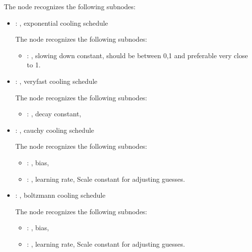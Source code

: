 \begin{itemize}
      The  node recognizes the following subnodes:
      \begin{itemize}
        \item {}: ,
          exponential cooling schedule

          The  node recognizes the following subnodes:
          \begin{itemize}
            \item {}: ,
              slowing down constant, should be between 0,1 and preferable very close to 1.
          \end{itemize}

        \item {}: ,
          veryfast cooling schedule

          The  node recognizes the following subnodes:
          \begin{itemize}
            \item {}: ,
              decay constant, 
          \end{itemize}

        \item {}: ,
          cauchy cooling schedule

          The  node recognizes the following subnodes:
          \begin{itemize}
            \item {}: ,
              bias, 

            \item {}: ,
              learning rate, Scale constant for adjusting guesses. 
          \end{itemize}

        \item {}: ,
          boltzmann cooling schedule

          The  node recognizes the following subnodes:
          \begin{itemize}
            \item {}: ,
              bias, 

            \item {}: ,
              learning rate, Scale constant for adjusting guesses. 
          \end{itemize}
      \end{itemize}


\end{itemize}
